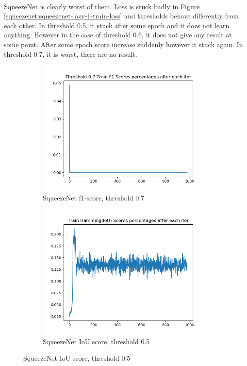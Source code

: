 \documentclass[12pt]{article}
\begin{document}
\paragraph{}SqueezeNet is clearly worst of them. Loss is stuck badly in Figure \ref{squeezenet:squeezenet-lazy-1-train-loss} and thresholds behave differently from each other. In threshold 0.5, it stuck after some epoch and it does not learn anything. However in the case of threshold 0.6, it does not give any result at some point. After some epoch score increase suddenly however it stuck again. In threshold 0.7, it is worst, there are no result. 
\begin{figure}[!ht]
\centering
\begin{subfigure}{.5\textwidth}
	\centering
	\includegraphics[width=.9\linewidth]{squeezenet-lazy-1-train-scores-f1-7.png}
	\caption{\label{squeezenet:squeezenet-lazy-1-train-scores-f1-7}SqueezeNet f1-score, threshold 0.7}
\end{subfigure}%
\begin{subfigure}{.5\textwidth}
	\centering
	\includegraphics[width=.9\linewidth]{squeezenet-lazy-1-train-scores-hs.png}
	\caption{\label{squeezenet:squeezenet-lazy-1-train-scores-hs}SqueezeNet IoU score, threshold 0.5}
\end{subfigure}
\end{figure}
\end{document}

